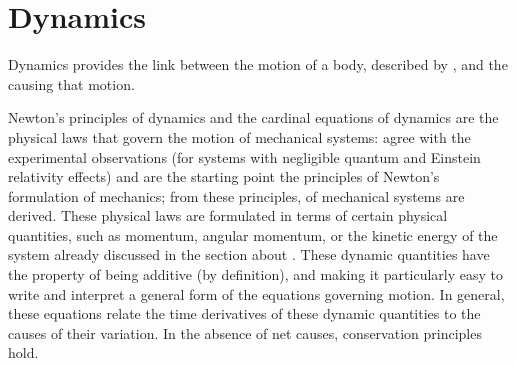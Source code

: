 \documentclass[letterpaper,10pt,english]{jupyterBook}
\begin{document}
\chapter{Dynamics}
\label{\detokenize{ch/dynamics:dynamics}}\label{\detokenize{ch/dynamics:classical-mechanics-dynamics}}\label{\detokenize{ch/dynamics::doc}}
\sphinxAtStartPar
Dynamics provides the link between the motion of a body, described by {\hyperref[\detokenize{ch/kinematics:classical-mechanics-kinematics}]{}}, and the  causing that motion.

\sphinxAtStartPar
Newton’s principles of dynamics and the cardinal equations of dynamics are the physical laws that govern the motion of mechanical systems: {\hyperref[\detokenize{ch/dynamics-principles:classical-mechanics-dynamics-principles}]{}} agree with the experimental observations (for systems with negligible quantum and Einstein relativity effects) and are the starting point \sphinxhyphen{} the principles \sphinxhyphen{} of Newton’s formulation of mechanics; from these principles, {\hyperref[\detokenize{ch/dynamics-eom:classical-mechanics-dynamics-eom}]{}} of mechanical systems are derived.
These physical laws are formulated in terms of certain physical quantities, such as momentum, angular momentum, or the kinetic energy of the system \sphinxhyphen{} already discussed in the section about {\hyperref[\detokenize{ch/inertia:classical-mechanics-inertia}]{}}. These dynamic quantities have the property of being additive (by definition), and making it particularly easy to write and interpret a general form of the equations governing motion. In general, these equations relate the time derivatives of these dynamic quantities to the causes of their variation. In the absence of net causes, conservation principles hold.



\sphinxstepscope
\end{document}
